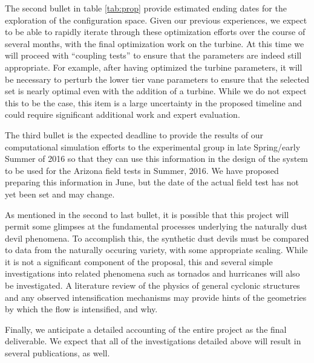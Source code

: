 %
%

The second bullet in table \ref{tab:prop} provide
estimated ending dates for the exploration of the configuration space. 
Given our previous experiences, we expect to be able to rapidly
iterate through these optimization efforts over the course of several
months, with the final optimization work on the turbine. 
At this time we will proceed with ``coupling tests'' to 
ensure that the parameters are indeed still appropriate. For example,
after having optimized the turbine parameters, it will be necessary to
perturb the lower tier vane parameters to ensure that the selected set
is nearly optimal even with the addition of a turbine. While we do not
expect this to be the case, this item is a large uncertainty in the
proposed timeline and could require significant additional work and
expert evaluation.  

%
%
The third bullet is the expected deadline to provide the results of our
computational simulation efforts to the experimental group in late
Spring/early Summer of 2016 so that they can use this information in the
design of the system to be used for the Arizona field tests in Summer,
2016. We have proposed preparing this information in June, but the date
of the actual field test has not yet been set and may change. 

As mentioned in the second to last bullet, it is possible that this
project will permit some glimpses  
at the fundamental processes underlying the naturally dust devil
phenomena. To accomplish this, the synthetic dust devils must be
compared to data from the naturally occuring variety,  with some
appropriate scaling. While it is not a significant component of the
proposal, this and several simple investigations into related phenomena
such as tornados and hurricanes will also  be investigated. A literature
review of the physics of general cyclonic structures and any observed
intensification mechanisms may provide hints of the geometries 
by which the flow is intensified, and why. 

Finally, we anticipate a detailed accounting of the entire project as
the final deliverable. We expect that all of the investigations detailed 
above will result in several publications, as well. 

%
%


